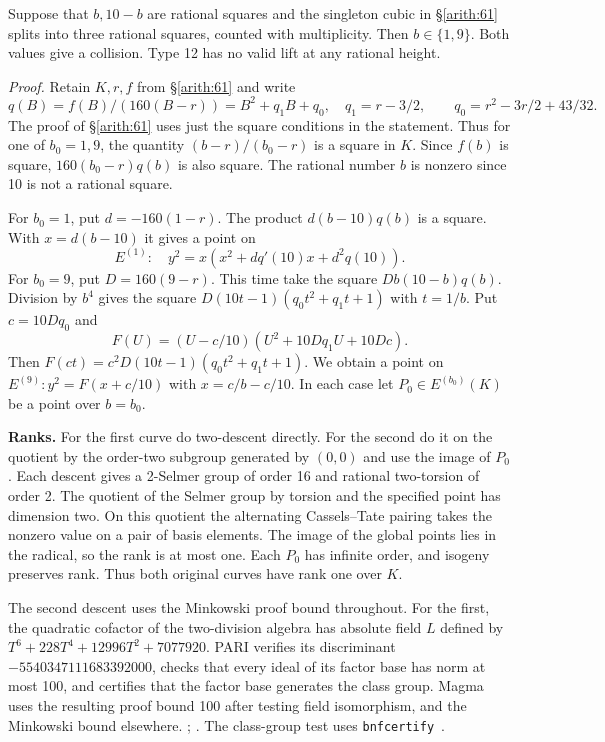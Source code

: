 Suppose that \(b,10-b\) are rational squares and the
singleton cubic in \S\ref{arith:61} splits into three rational squares,
counted with multiplicity. Then \(b\in\{1,9\}\). Both values give a
collision. Type 12 has no valid lift at any rational height.

\emph{Proof.} Retain \(K,r,f\) from \S\ref{arith:61} and write
\[q(B)=f(B)/(160(B-r))=B^2+q_1B+q_0,\quad
 q_1=r-3/2,\qquad q_0=r^2-3r/2+43/32.\]
The proof of \S\ref{arith:61} uses just the square conditions in the
statement. Thus for one of \(b_0=1,9\), the quantity \((b-r)/(b_0-r)\)
is a square in \(K\). Since \(f(b)\) is square, \(160(b_0-r)q(b)\)
is also square. The rational number \(b\) is nonzero since 10 is
not a rational square.

For \(b_0=1\), put \(d=-160(1-r)\). The product \(d(b-10)q(b)\) is a
square. With \(x=d(b-10)\) it gives a point on
\[E^{(1)}:\quad y^2=x(x^2+dq'(10)x+d^2q(10)).\]
For \(b_0=9\), put \(D=160(9-r)\). This time take the square
\(D b(10-b)q(b)\). Division by \(b^4\) gives the square
\(D(10t-1)(q_0t^2+q_1t+1)\) with \(t=1/b\). Put \(c=10Dq_0\) and
\[F(U)=(U-c/10)(U^2+10Dq_1U+10Dc).\]
Then \(F(ct)=c^2D(10t-1)(q_0t^2+q_1t+1)\). We obtain a point on
\(E^{(9)}:y^2=F(x+c/10)\) with \(x=c/b-c/10\). In each case let
\(P_0\in E^{(b_0)}(K)\) be a point over \(b=b_0\).

\textbf{Ranks.} For the first curve do two-descent directly. For the second
do it on the quotient by the order-two subgroup generated by \((0,0)\)
and use the image of \(P_0\). Each descent gives a 2-Selmer group of
order 16 and rational two-torsion of order 2. The quotient of the
Selmer group by torsion and the specified point has dimension two.
On this quotient the alternating Cassels--Tate pairing takes the
nonzero value on a pair of basis elements. The image of the global
points lies in the radical, so the rank is at most one. Each \(P_0\)
has infinite order, and isogeny preserves rank. Thus both original
curves have rank one over \(K\).

The second descent uses the Minkowski proof bound throughout. For the
first, the quadratic cofactor of the two-division algebra has absolute
field \(L\) defined by \(T^6+228T^4+12996T^2+7077920\). PARI verifies
its discriminant \(-5540347111683392000\), checks that every ideal of
its factor base has norm at most 100, and certifies that the factor base
generates the class group. Magma uses the resulting proof bound 100
after testing field isomorphism, and the Minkowski bound elsewhere.
; . The class-group test uses \texttt{bnfcertify}~\cite{pari}.

